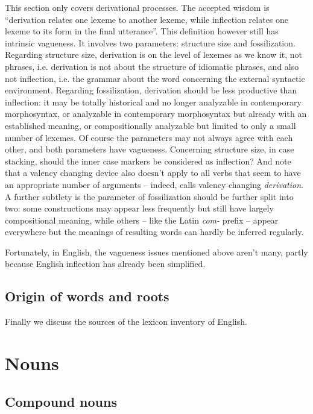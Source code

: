 \documentclass[UTF8, a4paper, oneside, scheme=plain]{ctexrep}
\newcommand*{\term}[1]{\emph{#1}}
\newcommand{\corpus}[1]{\emph{#1}}
\begin{document}
This section only covers derivational processes.
The accepted wisdom is ``derivation relates one lexeme to another lexeme,
while inflection relates one lexeme to its form in the final utterance''.
This definition however still has intrinsic vagueness.
It involves two parameters:
structure size
and fossilization.
Regarding structure size,
derivation is on the level of lexemes as we know it, not phrases,
i.e. derivation is not about the structure of idiomatic phrases,
and also not inflection,
i.e. the grammar about the word concerning the external syntactic environment.
Regarding fossilization, 
derivation should be less productive than inflection: 
it may be totally historical and no longer analyzable in contemporary morphosyntax,
or analyzable in contemporary morphosyntax but already with an established meaning,
or compositionally analyzable but limited to only a small number of lexemes.
Of course the parameters may not always agree with each other,
and both parameters have vagueness.
Concerning structure size, in case stacking, 
should the inner case markers be considered as inflection?
And note that a valency changing device also doesn't apply to all verbs that seem to have 
an appropriate number of arguments --
indeed, \citet{jacques2021grammar} calls valency changing \term{derivation}.
A further subtlety is the parameter of fossilization should be further split into two:
some constructions may appear less frequently but still have largely compositional meaning,
while others -- like the Latin \corpus{com-} prefix -- 
appear everywhere but the meanings of resulting words
can hardly be inferred regularly.

Fortunately, in English, the vagueness issues mentioned above aren't many,
partly because English inflection has already been simplified.

\subsection{Origin of words and roots}

Finally we discuss the sources of the lexicon inventory of English.


\section{Nouns}

\subsection{Compound nouns}\label{sec:pos.noun.compound}
\end{document}
